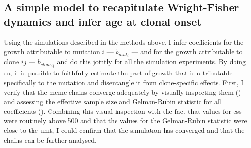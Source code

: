 \begin{figure}[!ht]
	\label{fig:replicate-data}
\end{figure}

\begin{figure}[!ht]
	\label{fig:overdispersion-chains}
\end{figure}

\begin{figure}[!ht]
	\label{fig:overdispersion-longitudinal}
\end{figure}

\subsection{A simple model to recapitulate Wright-Fisher dynamics and infer age at clonal onset}

Using the simulations described in the methods above, I infer coefficients for the growth attributable to mutation $i$ --- $b_{mut_i}$ --- and for the growth attributable to clone $ij$ --- $b_{clone_{ij}}$ and do this jointly for all the simulation experiments. By doing so, it is possible to faithfully estimate the part of growth that is attributable specifically to the mutation and disentangle it from clone-specific effects. First, I verify that the \ac{mcmc} chains converge adequately by visually inspecting them () and assessing the effective sample size and Gelman-Rubin statistic for all coefficients (). Combining this visual inspection with the fact that values for \ac{ess} were routinely above 500 and that the values for the Gelman-Rubin statistic were close to the unit, I could confirm that the simulation has converged and that the chains can be further analysed. 

\begin{figure}[!ht]
	\label{fig:mcmc-chains-sim}
\end{figure}

